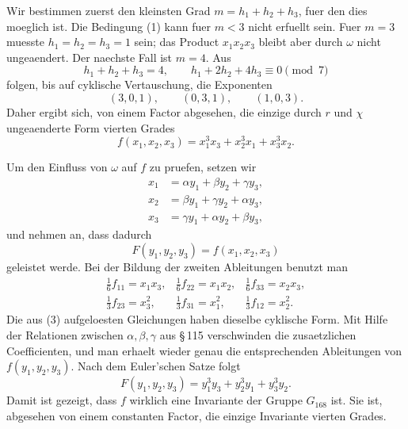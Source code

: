 \documentclass[11pt]{article}
\begin{document}
Wir bestimmen zuerst den kleinsten Grad \(m=h_1+h_2+h_3\), fuer den dies moeglich ist. Die Bedingung (1) kann fuer \(m<3\) nicht erfuellt sein. Fuer \(m=3\) muesste \(h_1=h_2=h_3=1\) sein; das Product \(x_1x_2x_3\) bleibt aber durch \(\omega\) nicht ungeaendert. Der naechste Fall ist \(m=4\). Aus
\begin{equation}
h_1+h_2+h_3=4,
\qquad
h_1+2h_2+4h_3\equiv0\pmod 7
\end{equation}
folgen, bis auf cyklische Vertauschung, die Exponenten
\begin{equation}
(3,0,1),\qquad (0,3,1),\qquad (1,0,3).
\end{equation}
Daher ergibt sich, von einem Factor abgesehen, die einzige durch \(r\) und \(\chi\) ungeaenderte Form vierten Grades
\begin{equation}
f(x_1,x_2,x_3)=x_1^3x_3+x_2^3x_1+x_3^3x_2.
\tag{2}
\end{equation}

Um den Einfluss von \(\omega\) auf \(f\) zu pruefen, setzen wir
\begin{equation}
\begin{aligned}
x_1&=\alpha y_1+\beta y_2+\gamma y_3,\\
x_2&=\beta y_1+\gamma y_2+\alpha y_3,\\
x_3&=\gamma y_1+\alpha y_2+\beta y_3,
\end{aligned}
\tag{3}
\end{equation}
und nehmen an, dass dadurch
\begin{equation}
F(y_1,y_2,y_3)=f(x_1,x_2,x_3)
\tag{4}
\end{equation}
geleistet werde. Bei der Bildung der zweiten Ableitungen benutzt man
\begin{equation}
\begin{array}{lll}
\frac16 f_{11}=x_1x_3,&\frac16 f_{22}=x_1x_2,&\frac16 f_{33}=x_2x_3,\\[2mm]
\frac13 f_{23}=x_3^2,&\frac13 f_{31}=x_1^2,&\frac13 f_{12}=x_2^2.
\end{array}
\end{equation}
Die aus (3) aufgeloesten Gleichungen haben dieselbe cyklische Form. Mit Hilfe der Relationen zwischen \(\alpha,\beta,\gamma\) aus \S\,115 verschwinden die zusaetzlichen Coefficienten, und man erhaelt wieder genau die entsprechenden Ableitungen von \(f(y_1,y_2,y_3)\). Nach dem Euler'schen Satze folgt
\begin{equation}
F(y_1,y_2,y_3)=y_1^3y_3+y_2^3y_1+y_3^3y_2.
\end{equation}
Damit ist gezeigt, dass \(f\) wirklich eine Invariante der Gruppe \(G_{168}\) ist. Sie ist, abgesehen von einem constanten Factor, die einzige Invariante vierten Grades.
\end{document}
